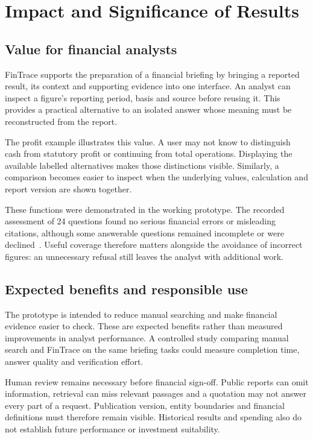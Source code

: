 \section{Impact and Significance of Results}
\label{sec:Impact and Significance of Results}

\subsection{Value for financial analysts}
FinTrace supports the preparation of a financial briefing by bringing a reported result, its context and supporting evidence into one interface. An analyst can inspect a figure's reporting period, basis and source before reusing it. This provides a practical alternative to an isolated answer whose meaning must be reconstructed from the report.

The profit example illustrates this value. A user may not know to distinguish cash from statutory profit or continuing from total operations. Displaying the available labelled alternatives makes those distinctions visible. Similarly, a comparison becomes easier to inspect when the underlying values, calculation and report version are shown together.

These functions were demonstrated in the working prototype. The recorded assessment of 24 questions found no serious financial errors or misleading citations, although some answerable questions remained incomplete or were declined~\cite{fintraceReleaseReview2026}. Useful coverage therefore matters alongside the avoidance of incorrect figures: an unnecessary refusal still leaves the analyst with additional work.

\subsection{Expected benefits and responsible use}
The prototype is intended to reduce manual searching and make financial evidence easier to check. These are expected benefits rather than measured improvements in analyst performance. A controlled study comparing manual search and FinTrace on the same briefing tasks could measure completion time, answer quality and verification effort.

Human review remains necessary before financial sign-off. Public reports can omit information, retrieval can miss relevant passages and a quotation may not answer every part of a request. Publication version, entity boundaries and financial definitions must therefore remain visible. Historical results and spending also do not establish future performance or investment suitability.

